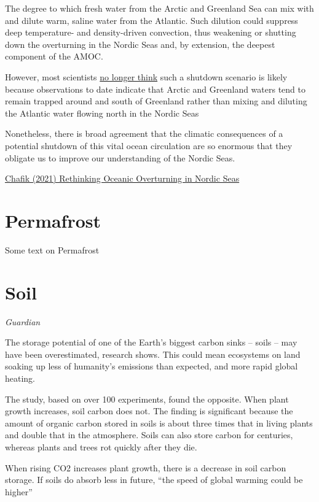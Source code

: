 \documentclass[
]{book}
\begin{document}
The degree to which fresh water from the Arctic and Greenland Sea can mix with and dilute warm, saline water from the Atlantic. Such dilution could suppress deep temperature- and density-driven convection, thus weakening or shutting down the overturning in the Nordic Seas and, by extension, the deepest component of the AMOC.

However, most scientists \href{https://www.carbonbrief.org/guest-post-could-the-atlantic-overturning-circulation-shut-down}{no longer think} such a shutdown scenario is likely because observations to date indicate that Arctic and Greenland waters tend to remain trapped around and south of Greenland rather than mixing and diluting the Atlantic water flowing north in the Nordic Seas

Nonetheless, there is broad agreement that the climatic consequences of a potential shutdown of this vital ocean circulation are so enormous that they obligate us to improve our understanding of the Nordic Seas.

\href{https://eos.org/science-updates/rethinking-oceanic-overturning-in-the-nordic-seas\#.YHvKO1RSYTk.twitter}{Chafik (2021) Rethinking Oceanic Overturning in Nordic Seas}

\hypertarget{permafrost}{%
\chapter{Permafrost}\label{permafrost}}

Some text on Permafrost

\hypertarget{soil}{%
\chapter{Soil}\label{soil}}

\emph{Guardian}

The storage potential of one of the Earth's biggest carbon sinks -- soils -- may have been overestimated, research shows. This could mean ecosystems on land soaking up less of humanity's emissions than expected, and more rapid global heating.

The study, based on over 100 experiments, found the opposite. When plant growth increases, soil carbon does not. The finding is significant because the amount of organic carbon stored in soils is about three times that in living plants and double that in the atmosphere. Soils can also store carbon for centuries, whereas plants and trees rot quickly after they die.

When rising CO2 increases plant growth, there is a decrease in soil carbon storage.
If soils do absorb less in future, ``the speed of global warming could be higher''
\end{document}
